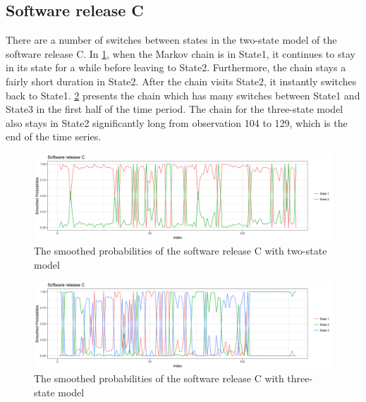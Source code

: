 \subsection{Software release C}

There are a number of switches between states in the two-state model
of the software release C. In \ref{L17A_2_smo}, when the Markov chain
is in State1, it continues to stay in its state for a while before
leaving to State2. Furthermore, the chain stays a fairly short duration
in State2. After the chain visits State2, it instantly switches back
to State1. \ref{L17A_3_smo} presents the chain which has many switches
between State1 and State3 in the first half of the time period. The
chain for the three-state model also stays in State2 significantly
long from observation 104 to 129, which is the end of the time series.

\begin{figure}[H]
\centering{}\includegraphics[scale=0.35]{picture/L17A_2_smo1}\caption{The smoothed probabilities of the software release C with two-state
model}
\label{L17A_2_smo}
\end{figure}
\begin{figure}[H]
\centering{}\includegraphics[scale=0.35]{picture/L17A_3_smo1}\caption{The smoothed probabilities of the software release C with three-state
model}
\label{L17A_3_smo}
\end{figure}

